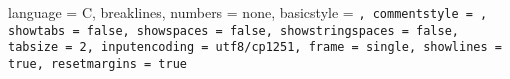 

\usepackage{listingsutf8}

\lstset
{
    language = C,
	breaklines,
	numbers = none,
    basicstyle = \tt\fontsize{12pt}{12pt}\selectfont,
    commentstyle = ,
    showtabs = false, 
    showspaces = false,
    showstringspaces = false,
    tabsize = 2,
    inputencoding = utf8/cp1251,
	frame = single,
	showlines = true,
	resetmargins = true
}

\renewcommand{\thelstcon}{\arabic{section}.\arabic{lstcon}}


%
%
%
%

\newcommand{\mylistingcaption}{}
\newcommand{\mylistinglabel}{}

\newcommand{\mylistingbegin}[2]
{
	\refstepcounter{lstcon}
	\renewcommand{\mylistingcaption}{\vbox{\small \centering Листинг~\thelstcon~---~#2}}
	\renewcommand{\mylistinglabel}{\label{listing:#1}}
	\begin{adjustwidth}{-\leftmargin}{\rightmargin}
}

\newcommand{\mylistingend}
{
	\mylistingcaption
	\mylistinglabel
	\end{adjustwidth}
	\medskip
}


%
%
%
\newcommand{\mysource}[3]
{
	\refstepcounter{lstcon}
	\label{listing:#2}
	{
		
		\nopagebreak
			
		\vbox{\small \centering Листинг~\thelstcon~---~#3}
		\bigskip
	}
}

